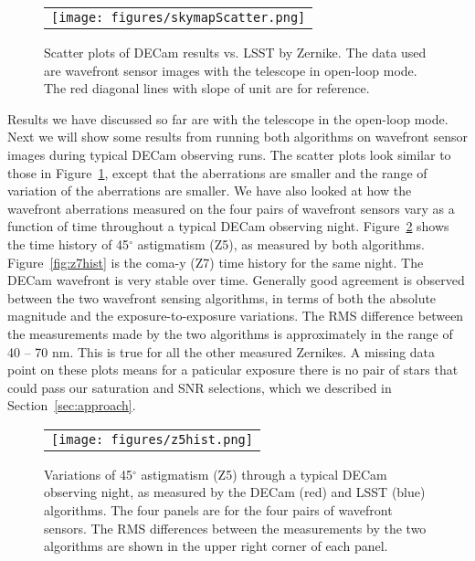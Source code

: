 \documentclass[]{spie}  %
\begin{document}
   \begin{figure} [tphb]
   \begin{center}
   \begin{tabular}{c} %
   \texttt{[image: figures/skymapScatter.png]}
   \end{tabular}
   \end{center}
   \caption[example] 
   { \label{fig:skymapScatter} 
Scatter plots of DECam results vs. LSST by Zernike. The data used are wavefront sensor images with the telescope in open-loop mode. The red diagonal lines with slope of unit are for reference.
}
   \end{figure} 

Results we have discussed so far are with the telescope in the open-loop mode.
Next we will show some results from running both algorithms on wavefront sensor images during typical DECam observing runs. The scatter plots look similar to those in Figure~\ref{fig:skymapScatter}, except that
the aberrations are smaller and 
the range of variation of the aberrations are smaller.
We have also looked at how the wavefront aberrations measured on the four pairs of wavefront sensors vary
as a function of time throughout a typical DECam observing night.
Figure~\ref{fig:z5hist} shows the time history of 45$^\circ$ astigmatism (Z5), as measured by both algorithms.
Figure~\ref{fig:z7hist} is the coma-y (Z7) time history for the same night.
The DECam wavefront is very stable over time.
Generally good agreement is observed between the two wavefront sensing algorithms, in terms of both the absolute magnitude and the exposure-to-exposure variations.
The RMS difference between the measurements made by the two algorithms is approximately in the range of 40 -- 70 nm. This is true for all the other measured Zernikes.
A missing data point on these plots means for a paticular exposure there is no pair of stars that could pass our saturation and SNR selections, which we described in Section~\ref{sec:approach}.

   \begin{figure} [tbph]
   \begin{center}
   \begin{tabular}{c} %
   \texttt{[image: figures/z5hist.png]}
   \end{tabular}
   \end{center}
   \caption[example] 
   { \label{fig:z5hist} 
Variations of 45$^\circ$ astigmatism (Z5) through a typical DECam observing night, as measured by the DECam (red) and LSST (blue) algorithms. The four panels are for the four pairs of wavefront sensors.
The RMS differences between the measurements by the two algorithms are shown in the upper right corner of each panel. 
}
   \end{figure} 
\end{document}
